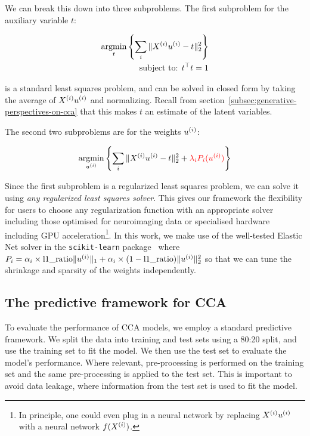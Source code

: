 We can break this down into three subproblems.
The first subproblem for the auxiliary variable \(t\):

\begin{align}
    \underset{t}{\mathrm{argmin}}\left\{\sum_i \|X^{(i)} u^{(i)} - t\|_2^2\right\}\\
    \text{subject to: }t^\top t = 1\\
\end{align}

is a standard least squares problem, and can be solved in closed form by taking the average of $X^{(i)} u^{(i)}$ and normalizing.
Recall from section~\ref{subsec:generative-perspectives-on-cca} that this makes $t$ an estimate of the latent variables.

The second two subproblems are for the \gls{weights} \(u^{(i)}\):

\begin{align}
    \underset{u^{(i)}}{\mathrm{argmin}}\left\{\sum_i \|X^{(i)} u^{(i)} - t\|_2^2 + \textcolor{red}{\lambda_i P_i(u^{(i)})} \right\}\\
\end{align}

Since the first subproblem is a regularized least squares problem, we can solve it using \textit{any regularized least squares solver}.
This gives our framework the flexibility for users to choose any regularization function with an appropriate solver including those optimised for neuroimaging data\citep{Nilearn_contributors_Nilearn} or specialised hardware including GPU acceleration\footnote{In principle, one could even plug in a neural network by replacing $X^{(i)} u^{(i)}$ with a neural network $f(X^{(i)})$.}.
In this work, we make use of the well-tested Elastic Net solver in the \texttt{scikit-learn} package~\citep{pedregosa2011scikit} where $P_i=\alpha_i \times \text{l1\_ratio} \|u^{(i)}\|_1 + \alpha_i \times (1-\text{l1\_ratio}) \|u^{(i)}\|^2_2$ so that we can tune the shrinkage and sparsity of the \gls{weights} independently.

\subsection{The predictive framework for CCA}\label{subsec:the-predictive-framework-for-cca}

To evaluate the performance of CCA models, we employ a standard predictive framework.
We split the data into training and test sets using a 80:20 split, and use the training set to fit the model.
We then use the test set to evaluate the model's performance.
Where relevant, pre-processing is performed on the training set and the same pre-processing is applied to the test set.
This is important to avoid data leakage, where information from the test set is used to fit the model.

